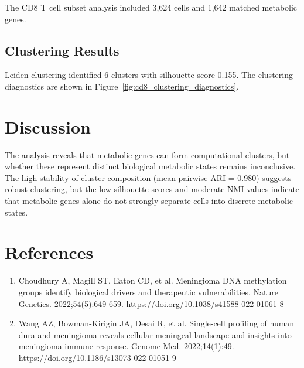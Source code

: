 \documentclass[11pt]{article}
\begin{document}
The CD8 T cell subset analysis included 3,624 cells and 1,642 matched metabolic genes.

\subsection{Clustering Results}

Leiden clustering identified 6 clusters with silhouette score 0.155. The clustering diagnostics are shown in Figure~\ref{fig:cd8_clustering_diagnostics}.

\section{Discussion}

The analysis reveals that metabolic genes can form computational clusters, but whether these represent distinct biological metabolic states remains inconclusive. The high stability of cluster composition (mean pairwise ARI = 0.980) suggests robust clustering, but the low silhouette scores and moderate NMI values indicate that metabolic genes alone do not strongly separate cells into discrete metabolic states.

\section{References}

\begin{enumerate}
\item Choudhury A, Magill ST, Eaton CD, et al. Meningioma DNA methylation groups identify biological drivers and therapeutic vulnerabilities. Nature Genetics. 2022;54(5):649-659. \url{https://doi.org/10.1038/s41588-022-01061-8}
\item Wang AZ, Bowman-Kirigin JA, Desai R, et al. Single-cell profiling of human dura and meningioma reveals cellular meningeal landscape and insights into meningioma immune response. Genome Med. 2022;14(1):49. \url{https://doi.org/10.1186/s13073-022-01051-9}
\end{enumerate}
\end{document}
